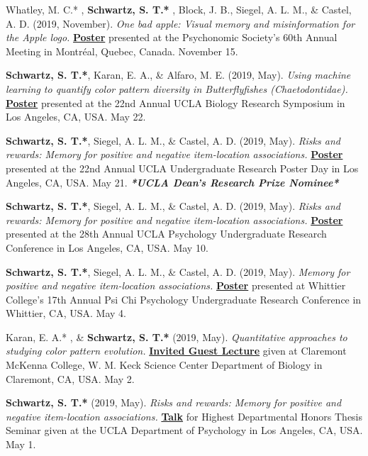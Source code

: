 Whatley, M. C.* \dag, \textbf{Schwartz, S. T.* \dag}, Block, J. B., Siegel, A. L. M., \& Castel, A. D. (2019, November). \textit{One bad apple: Visual memory and misinformation for the Apple logo.} \textbf{\underline{Poster}} presented at the Psychonomic Society's 60th Annual Meeting in Montr\'eal, Quebec, Canada. November 15.

\pubspace

\textbf{Schwartz, S. T.*}, Karan, E. A., \& Alfaro, M. E. (2019, May). \textit{Using machine learning to quantify color pattern diversity in Butterflyfishes (Chaetodontidae).} \textbf{\underline{Poster}} presented at the 22nd Annual UCLA Biology Research Symposium in Los Angeles, CA, USA. May 22.

\pubspace

\textbf{Schwartz, S. T.*}, Siegel, A. L. M., \& Castel, A. D. (2019, May). \textit{Risks and rewards: Memory for positive and negative item-location associations.} \textbf{\underline{Poster}} presented at the 22nd Annual UCLA Undergraduate Research Poster Day in Los Angeles, CA, USA. May 21. \textbf{\textit{*UCLA Dean's Research Prize Nominee*}}

\pubspace

\textbf{Schwartz, S. T.*}, Siegel, A. L. M., \& Castel, A. D. (2019, May). \textit{Risks and rewards: Memory for positive and negative item-location associations.} \textbf{\underline{Poster}} presented at the 28th Annual UCLA Psychology Undergraduate Research Conference in Los Angeles, CA, USA. May 10.

\pubspace

\textbf{Schwartz, S. T.*}, Siegel, A. L. M., \& Castel, A. D. (2019, May). \textit{Memory for positive and negative item-location associations.} \textbf{\underline{Poster}} presented at Whittier College's 17th Annual Psi Chi Psychology Undergraduate Research Conference in Whittier, CA, USA. May 4.

\pubspace

Karan, E. A.* \dag, \& \textbf{Schwartz, S. T.* \dag} (2019, May). \textit{Quantitative approaches to studying color pattern evolution.} \textbf{\underline{Invited Guest Lecture}} given at Claremont McKenna College, W. M. Keck Science Center Department of Biology in Claremont, CA, USA. May 2.

\pubspace

\textbf{Schwartz, S. T.*} (2019, May). \textit{Risks and rewards: Memory for positive and negative item-location associations.} \textbf{\underline{Talk}} for Highest Departmental Honors Thesis Seminar given at the UCLA Department of Psychology in Los Angeles, CA, USA. May 1.